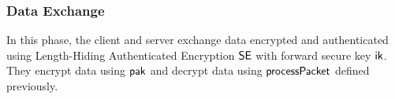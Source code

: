 \subsubsection{Data Exchange}
In this phase, the client and server exchange data
encrypted and authenticated using Length-Hiding
Authenticated Encryption $\mathsf{SE}$ with forward secure key
$\mathsf{ik}$.
They encrypt data using $\mathsf{pak}$ and decrypt data using
$\mathsf{processPacket}$ defined previously.